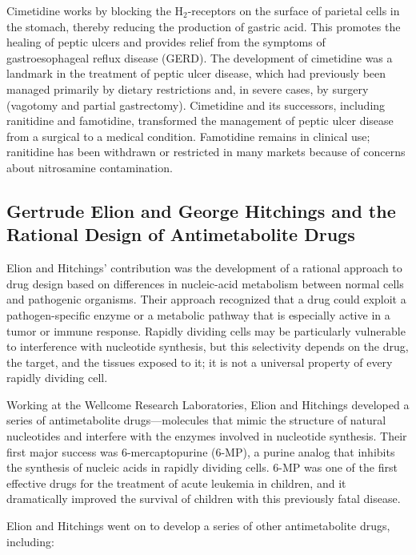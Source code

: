 Cimetidine works by blocking the H$_2$-receptors on the surface of parietal cells in the stomach, thereby reducing the production of gastric acid. This promotes the healing of peptic ulcers and provides relief from the symptoms of gastroesophageal reflux disease (GERD). The development of cimetidine was a landmark in the treatment of peptic ulcer disease, which had previously been managed primarily by dietary restrictions and, in severe cases, by surgery (vagotomy and partial gastrectomy). Cimetidine and its successors, including ranitidine and famotidine, transformed the management of peptic ulcer disease from a surgical to a medical condition. Famotidine remains in clinical use; ranitidine has been withdrawn or restricted in many markets because of concerns about nitrosamine contamination.

\subsection{Gertrude Elion and George Hitchings and the Rational Design of Antimetabolite Drugs}

Elion and Hitchings' contribution was the development of a rational approach to drug design based on differences in nucleic-acid metabolism between normal cells and pathogenic organisms. Their approach recognized that a drug could exploit a pathogen-specific enzyme or a metabolic pathway that is especially active in a tumor or immune response. Rapidly dividing cells may be particularly vulnerable to interference with nucleotide synthesis, but this selectivity depends on the drug, the target, and the tissues exposed to it; it is not a universal property of every rapidly dividing cell.

Working at the Wellcome Research Laboratories, Elion and Hitchings developed a series of antimetabolite drugs---molecules that mimic the structure of natural nucleotides and interfere with the enzymes involved in nucleotide synthesis. Their first major success was 6-mercaptopurine (6-MP), a purine analog that inhibits the synthesis of nucleic acids in rapidly dividing cells. 6-MP was one of the first effective drugs for the treatment of acute leukemia in children, and it dramatically improved the survival of children with this previously fatal disease.

Elion and Hitchings went on to develop a series of other antimetabolite drugs, including:

